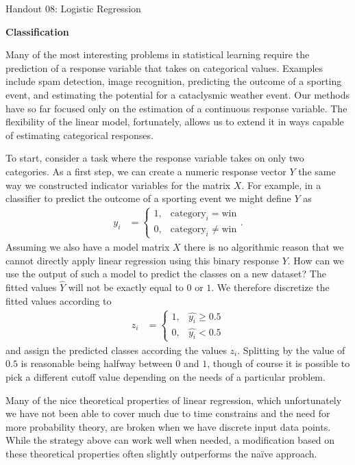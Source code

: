\documentclass[12pt,hidelinks]{article}
\numberwithin{equation}{section}
\begin{document}
{\LARGE Handout 08: Logistic Regression}

\vspace*{18pt}

\textbf{Classification}

Many of the most interesting problems in statistical learning
require the prediction of a response variable that takes on
categorical values. Examples include spam detection, image
recognition, predicting the outcome of a sporting event, and
estimating the potential for a cataclysmic weather event. Our
methods have so far focused only on the estimation of a
continuous response variable. The flexibility of the linear
model, fortunately, allows us to extend it in ways
capable of estimating categorical responses.

To start, consider a task where the response variable takes
on only two categories. As a first step, we can create a numeric
response vector $Y$ the same way we constructed indicator
variables for the matrix $X$. For example, in a classifier to
predict the outcome of a sporting event we might define $Y$ as
\begin{align}
y_i &= \begin{cases} 1, & \text{category}_i =
   \text{win} \\ 0, & \text{category}_i \neq \text{win} \end{cases}.
\end{align}
Assuming we also have a model matrix $X$ there is no algorithmic
reason that we cannot directly apply linear regression using this
binary response $Y$.
How can we use the output of such a model to predict the classes
on a new dataset? The fitted values $\widehat{Y}$ will not be
exactly equal to $0$ or $1$. We therefore discretize the fitted
values according to
\begin{align}
z_i &= \begin{cases} 1, & \widehat{y_i} \geq 0.5 \\
 0, & \widehat{y_i} < 0.5 \end{cases} \label{disc_response}
\end{align}
and assign the predicted classes according the values $z_i$.
Splitting by the value of $0.5$ is reasonable being halfway
between $0$ and $1$, though of course it is possible to pick a
different cutoff value depending on the needs of a particular
problem.

Many of the nice theoretical properties of linear regression,
which unfortunately we have not been able to cover much due
to time constrains and the need for more probability theory,
are broken when we have discrete input data points. While the
strategy above can work well when needed, a modification based
on these theoretical properties often slightly outperforms the
naïve approach.
\end{document}

